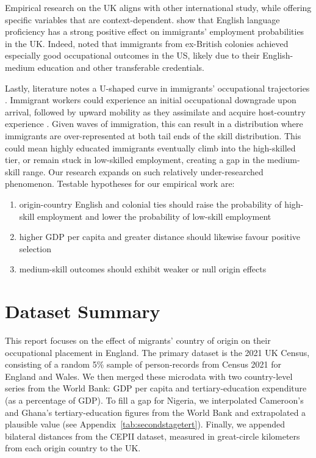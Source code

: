 \documentclass[12pt, a4paper]{article}
\begin{document}
Empirical research on the UK aligns with other international study, while offering specific variables that are context-dependent. \citet{DustmannFabbriLanguage} show that English language proficiency has a strong positive effect on immigrants’ employment probabilities in the UK. Indeed, \citet{MattooBrainWaste} noted that immigrants from ex-British colonies achieved especially good occupational outcomes in the US, likely due to their English-medium education and other transferable credentials. 

Lastly, literature notes a U-shaped curve in immigrants’ occupational trajectories \citep{ZorluUshaped}. Immigrant workers could experience an initial occupational downgrade upon arrival, followed by upward mobility as they assimilate and acquire host-country experience \citep{ChiswickTimeSpent}. Given waves of immigration, this can result in a distribution where immigrants are over-represented at both tail ends of the skill distribution. This could mean highly educated immigrants eventually climb into the high-skilled tier, or remain stuck in low-skilled employment, creating a gap in the medium-skill range. Our research expands on such relatively under-researched phenomenon. Testable hypotheses for our empirical work are: 

\begin{enumerate}[label=(\roman*)]
    \item origin-country English and colonial ties should raise the probability of high-skill employment and lower the probability of low-skill employment
    \item higher GDP per capita and greater distance should likewise favour positive selection
    \item medium-skill outcomes should exhibit weaker or null origin effects
\end{enumerate}


\section{Dataset Summary} \label{sec:data}

This report focuses on the effect of migrants’ country of origin on their occupational placement in England.  The primary dataset is the 2021 UK Census, consisting of a random 5\% sample of person-records from Census 2021 for England and Wales.  We then merged these microdata with two country-level series from the World Bank: GDP per capita and tertiary-education expenditure (as a percentage of GDP).  To fill a gap for Nigeria, we interpolated Cameroon’s and Ghana’s tertiary-education figures from the World Bank and extrapolated a plausible value (see Appendix~\ref{tab:secondstagetert}).  Finally, we appended bilateral distances from the CEPII dataset, measured in great-circle kilometers from each origin country to the UK.
\end{document}
